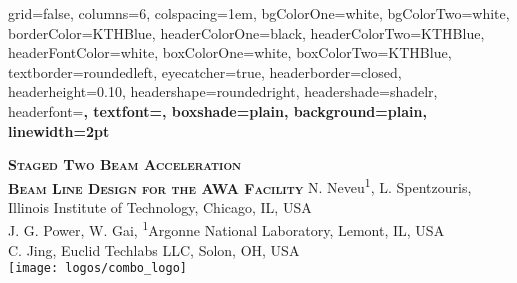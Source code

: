 \documentclass[portrait,final,paperwidth=105cm, paperheight=160cm,  fontscale=0.277]{baposter}
\begin{document}
\begin{poster}{
	grid=false,
	columns=6,
	colspacing=1em,
	bgColorOne=white,
	bgColorTwo=white,
	borderColor=KTHBlue,
	headerColorOne=black,
	headerColorTwo=KTHBlue,
	headerFontColor=white,
	boxColorOne=white,
	boxColorTwo=KTHBlue,
	textborder=roundedleft,
	eyecatcher=true,
	headerborder=closed,
	headerheight=0.10\textheight,
	headershape=roundedright,
	headershade=shadelr,
	headerfont=\Large\bf\textsc, %
	textfont={\setlength{\parindent}{0em}},
	boxshade=plain,
	background=plain,
	linewidth=2pt
}
{
	
		
} %
{\bf\textsc{Staged Two Beam Acceleration \\
		\vspace{0.3em} Beam Line Design for the AWA Facility}}%
{\vspace{1em}
	N. Neveu\textsuperscript{1}, L. Spentzouris, Illinois Institute of Technology, Chicago, IL, USA \\
	J. G. Power, W. Gai, \textsuperscript{1}Argonne National  Laboratory, Lemont, IL, USA \\
	C. Jing, Euclid Techlabs LLC, Solon, OH, USA \\
    }
{%
		\texttt{[image: logos/combo\_logo]}%
}






\end{poster}
\end{document}
